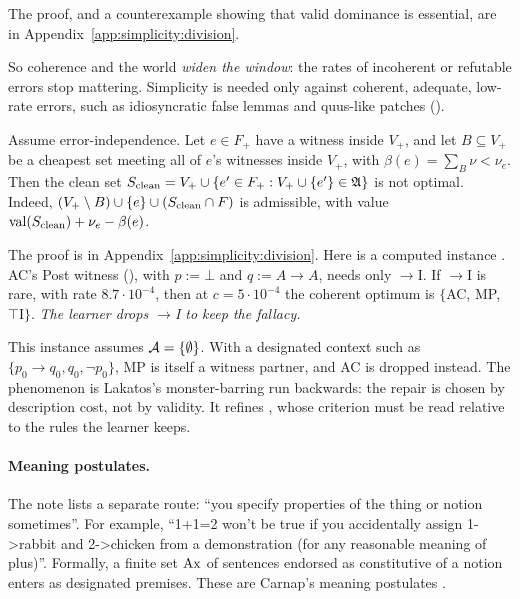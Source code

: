 The proof, and a counterexample showing that valid dominance is essential, are in Appendix~\ref{app:simplicity:division}.

So coherence and the world \emph{widen the window}: the rates of incoherent or refutable errors stop mattering. Simplicity is needed only against coherent, adequate, low-rate errors, such as idiosyncratic false lemmas and quus-like patches ().

\begin{proposition}\label{prop:simplicity:sacrifice}
Assume error-independence. Let $e\in F_+$ have a witness inside $V_+$, and let $B\subseteq V_+$ be a cheapest set meeting all of $e$'s witnesses inside $V_+$, with $\beta(e)=\sum_B\nu<\nu_e$. Then the clean set $S_{\rm clean}=V_+\cup\{e'\in F_+:V_+\cup\{e'\}\in\mathfrak A\}$ is not optimal. Indeed, $(V_+\setminus B)\cup\{e\}\cup(S_{\rm clean}\cap F)$ is admissible, with value $\mathrm{val}(S_{\rm clean})+\nu_e-\beta(e)$.
\end{proposition}

The proof is in Appendix~\ref{app:simplicity:division}. Here is a computed instance . AC's Post witness (), with $p:=\bot$ and $q:=A\to A$, needs only ${\to}$I. If ${\to}$I is rare, with rate $8.7\cdot10^{-4}$, then at $c=5\cdot10^{-4}$ the coherent optimum is $\{$AC, MP, $\top$I$\}$. \emph{The learner drops ${\to}$I to keep the fallacy.}

This instance assumes $\mathcal{A}=\{\emptyset\}$. With a designated context such as $\{p_0\to q_0,q_0,\neg p_0\}$, MP is itself a witness partner, and AC is dropped instead. The phenomenon is Lakatos's monster-barring \citep{lakatos1976proofs} run backwards: the repair is chosen by description cost, not by validity. It refines , whose criterion must be read relative to the rules the learner keeps.

\paragraph{Meaning postulates.} The note lists a separate route: ``you specify properties of the thing or notion sometimes''. For example, ``1+1=2 won't be true if you accidentally assign 1->rabbit and 2->chicken from a demonstration (for any reasonable meaning of plus)''. Formally, a finite set $\mathrm{Ax}$ of sentences endorsed as constitutive of a notion enters as designated premises. These are Carnap's meaning postulates \citep{carnap1952meaning}.

